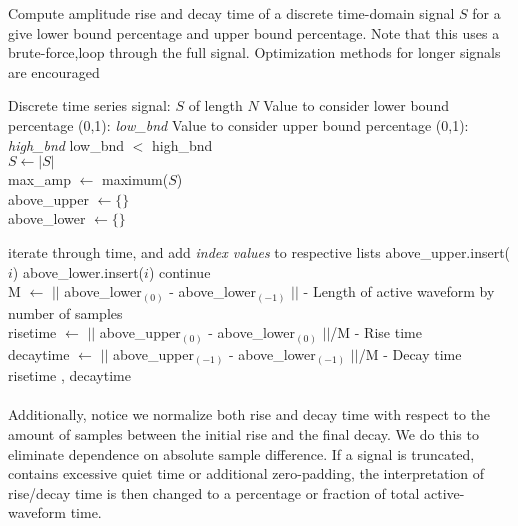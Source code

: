\documentclass[12pt,letterpaper]{article}
\begin{document}
\begin{algorithm}
\label{Rise-Decay Time}
\caption{Compute amplitude rise and decay time of a discrete time-domain signal $S$ for a give lower bound percentage and upper bound percentage. Note that this uses a brute-force,loop through the full signal. Optimization methods for longer signals are encouraged}

\begin{algorithmic}

\REQUIRE Discrete time series signal: $S$ of length $N$
\REQUIRE Value to consider lower bound percentage (0,1): \textit{low\_bnd}
\REQUIRE Value to consider upper bound percentage (0,1): \textit{high\_bnd}
\ENSURE low\_bnd $<$ high\_bnd \\

$S \leftarrow |S|$ \\
max\_amp $\leftarrow$ maximum($S$) \\
above\_upper $\leftarrow \{ \}$ \\
above\_lower $\leftarrow \{ \}$ \\
\item iterate through time, and add \textit{index values} to respective lists
		\STATE above\_upper.insert($i$)
		\STATE above\_lower.insert($i$)
		\ELSE
		\STATE continue
\ENDIF
\ENDFOR \\
M $\leftarrow$ $||$ above\_lower$_{(0)}$ - above\_lower$_{(-1)}$ $||$ - Length of active waveform by number of samples \\
risetime $\leftarrow$ $||$ above\_upper$_{(0)}$ - above\_lower$_{(0)}$ $||$/M - Rise time \\
decaytime $\leftarrow$ $||$ above\_upper$_{(-1)}$ - above\_lower$_{(-1)}$ $||$/M - Decay time \\
\RETURN risetime , decaytime
\end{algorithmic}
\end{algorithm}

\paragraph*{}Additionally, notice we normalize both rise and decay time with respect to the amount of samples between the initial rise and the final decay. We do this to eliminate dependence on absolute sample difference. If a signal is truncated, contains excessive quiet time or additional zero-padding, the interpretation of rise/decay time is then changed to a percentage or fraction of total active-waveform time.
\end{document}
